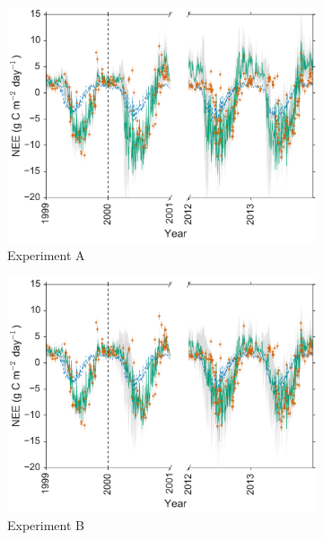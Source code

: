 \documentclass[review]{elsarticle}
\begin{document}
\begin{figure}
    \centering
    \begin{subfigure}[b]{0.49\textwidth}
        \includegraphics[width=\textwidth]{Abroke4dvar2.pdf}
        \caption{Experiment A}
        \label{fig:broke4dvardiagBR}
    \end{subfigure}
    \begin{subfigure}[b]{0.49\textwidth}
        \includegraphics[width=\textwidth]{Bbroke4dvar2.pdf}
        \caption{Experiment B}
        \label{fig:broke4dvaredcBR}
    \end{subfigure}
    \begin{subfigure}[b]{0.49\textwidth}

\end{subfigure}
\end{figure}
\end{document}
